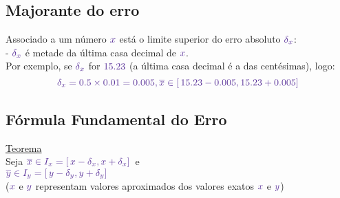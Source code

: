 \documentclass[12pt, a4paper, titlepage, oneside, dvipsnames]{report}
\begin{document}
    \subsection{\color{RoyalPurple} Majorante do erro}
        Associado a um número $\color{RoyalPurple} x$ está o limite superior do erro absoluto $\color{RoyalPurple} \delta_x$:\\
        - $\color{RoyalPurple} \delta_x$ é metade da última casa decimal de $\color{RoyalPurple} x$.\\
        Por exemplo, se $\color{RoyalPurple} \delta_x$ for $\color{RoyalPurple} 15.23$ (a última casa decimal é a das centésimas), logo:
        \[\color{RoyalPurple}
        \delta_x = 0.5 \times 0.01 = 0.005, \overline{x} \in [ \, 15.23 - 0.005, 15.23 + 0.005 ] \,
        \]

    \subsection{\color{RoyalPurple} Fórmula Fundamental do Erro}
    {\color{RoyalPurple} \underline{Teorema}}
    \\Seja $\color{RoyalPurple} \overline{x} \in I_x = [ \, x - \delta_x, x + \delta_x ] \,$ e \\
         $\color{RoyalPurple} \overline{y} \in I_y = [ \, y - \delta_y, y + \delta_y ] \,$\\
    ($\color{RoyalPurple} x$ e $\color{RoyalPurple} y$ representam valores aproximados dos valores exatos $\color{RoyalPurple} x$ e $\color{RoyalPurple} y$)



 
\end{document}
